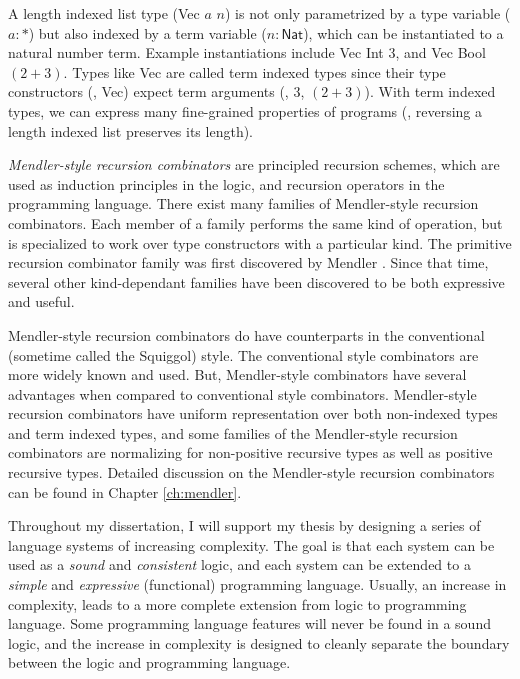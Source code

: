 A length indexed list type (\textsf{Vec} $a$ $n$) is not only parametrized by
a type variable ($a:*$) but also indexed by a term variable ($n:\textsf{Nat}$),
which can be instantiated to a natural number term. Example instantiations
include \textsf{Vec Int} 3, and \textsf{Vec Bool} $(2+3)$. Types like
\textsf{Vec} are called term indexed types since their type constructors
(\eg, \textsf{Vec}) expect term arguments (\eg, $3$, $(2+3)$). 
With term indexed types, we can express many fine-grained properties of
programs (\eg, reversing a length indexed list preserves its length).

\emph{Mendler-style recursion combinators} are principled recursion schemes,
which are used as induction principles in the logic, and recursion operators
in the programming language. There exist many families of Mendler-style
recursion combinators. Each member of a family performs the same kind of
operation, but is specialized to work over type constructors with
a particular kind. The primitive recursion combinator family was first
discovered by Mendler \cite{Mendler87}. Since that time, several other
kind-dependant families \cite{vene00phd,AbeMatUus03,AhnShe11} have been
discovered to be both expressive and useful.

Mendler-style recursion combinators do have counterparts in the conventional
(sometime called the Squiggol) style. The conventional style combinators are
more widely known and used. But, Mendler-style combinators have several
advantages when compared to conventional style combinators. Mendler-style
recursion combinators have uniform representation over both non-indexed types
and term indexed types, and some families of the Mendler-style recursion
combinators are normalizing for non-positive recursive types as well as
positive recursive types. Detailed discussion on the Mendler-style recursion
combinators can be found in Chapter \ref{ch:mendler}.

Throughout my dissertation, I will support my thesis by designing a series of
language systems of increasing complexity. The goal is that each system can be
used as a \emph{sound} and \emph{consistent} logic, and each system can be
extended to a \emph{simple} and \emph{expressive} (functional) programming
language. Usually, an increase in complexity, leads to a more complete
extension from logic to programming language. Some programming language features
will never be found in a sound logic, and the increase in complexity is designed
to cleanly separate the boundary between the logic and programming language.

